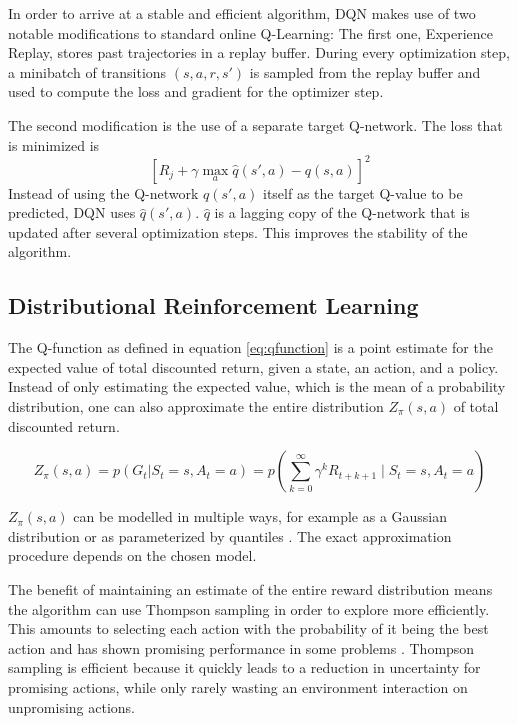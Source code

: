 In order to arrive at a stable and efficient algorithm, DQN makes use of two notable modifications to standard online Q-Learning:
The first one, Experience Replay, stores past trajectories in a replay buffer.
During every optimization step, a minibatch of transitions $(s, a, r, s')$ is sampled from the replay buffer and used to compute the loss and gradient for the optimizer step.

The second modification is the use of a separate target Q-network.
The loss that is minimized is
$$ [R_j + \gamma \max_a{\hat{q}(s',a)} - q(s,a)]^2$$
Instead of using the Q-network $q(s',a)$ itself as the target Q-value to be predicted, DQN uses $\hat{q}(s',a)$.
$\hat{q}$ is a lagging copy of the Q-network that is updated after several optimization steps.
This improves the stability of the algorithm.





\subsection{Distributional Reinforcement Learning}
The Q-function as defined in equation \ref{eq:qfunction} is a point estimate for the expected value of total discounted return, given a state, an action, and a policy.
Instead of only estimating the expected value, which is the mean of a probability distribution, one can also approximate the entire distribution $Z_\pi(s,a)$ of total discounted return.

\begin{equation} \label{eq:zfunction}
    Z_\pi(s,a) = p(G_t | S_t=s, A_t = a) = p\left(\sum_{k=0}^{\infty}\gamma^kR_{t+k+1} \mid S_t = s, A_t = a\right)
\end{equation}

$Z_\pi(s,a)$ can be modelled in multiple ways, for example as a Gaussian distribution \citep{azizzadenesheli2018EfficientExplorationBayesian} or as parameterized by quantiles \citep{dabney2018DistributionalReinforcementLearning}.
The exact approximation procedure depends on the chosen model.

The benefit of maintaining an estimate of the entire reward distribution means the algorithm can use Thompson sampling \citep{thompson1933LikelihoodThatOne} in order to explore more efficiently.
This amounts to selecting each action with the probability of it being the best action and has shown promising performance in some problems \citep{osband2013MoreEfficientReinforcement}.
Thompson sampling is efficient because it quickly leads to a reduction in uncertainty for promising actions, while only rarely wasting an environment interaction on unpromising actions.


